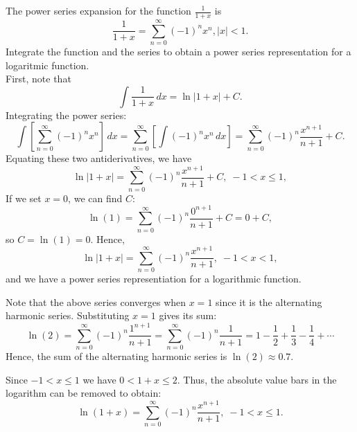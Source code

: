 \documentclass[handout]{ximera}
\begin{document}
\begin{example}[example 2]
The power series expansion for the function $\frac{1}{1+x}$ is 
\[
\frac{1}{1+x} = \sum_{n=0}^\infty (-1)^n x^n, |x| < 1.
\]
Integrate the function and the series to obtain a power series representation for a logaritmic function.\\
First, note that
\[
\int \frac{1}{1+x} \, dx = \ln|1+x| + C.
\]
Integrating the power series:
\[
\int \left[\sum_{n=0}^\infty (-1)^n x^n \right] \, dx =  \sum_{n=0}^\infty \left[ \int(-1)^n x^n \, dx \right] = \sum_{n=0}^\infty  (-1)^n \frac{x^{n+1}}{n+1} +C.
\]
Equating these two antiderivatives, we have
\[
\ln|1+x| = \sum_{n=0}^\infty  (-1)^n \frac{x^{n+1}}{n+1} +C, \; -1 < x \leq 1,
\]
If we set $x = 0$, we can find $C$:
\[
\ln(1) = \sum_{n=0}^\infty  (-1)^n \frac{0^{n+1}}{n+1} +C = 0 + C,
\]
so $C = \ln(1) = 0$. Hence,
\[
\ln|1+x| = \sum_{n=0}^\infty  (-1)^n \frac{x^{n+1}}{n+1}, \; -1 < x < 1,
\]
and we have a power series representiation for a logarithmic function.

\begin{remark}[Remark 1]
Note that the above series converges when $x = 1$ since it is the alternating harmonic series. Substituting $x = 1$ gives its sum:
\[
\ln(2) = \sum_{n=0}^\infty  (-1)^n \frac{1^{n+1}}{n+1} = \sum_{n=0}^\infty  (-1)^n \frac{1}{n+1} = 1 - \frac12 + \frac13 - \frac14 + \cdots
\]
Hence, the sum of the alternating harmonic series is $\ln(2) \approx 0.7$.
\end{remark}

\begin{remark}[Remark 2]
Since $-1 < x\leq 1$ we have $0 < 1+x \leq 2$. Thus, the absolute value bars in the logarithm can be removed to obtain:
\[
\ln(1+x) = \sum_{n=0}^\infty  (-1)^n \frac{x^{n+1}}{n+1}, \; -1 < x \leq 1.
\]
\end{remark}

\end{example}
\end{document}
